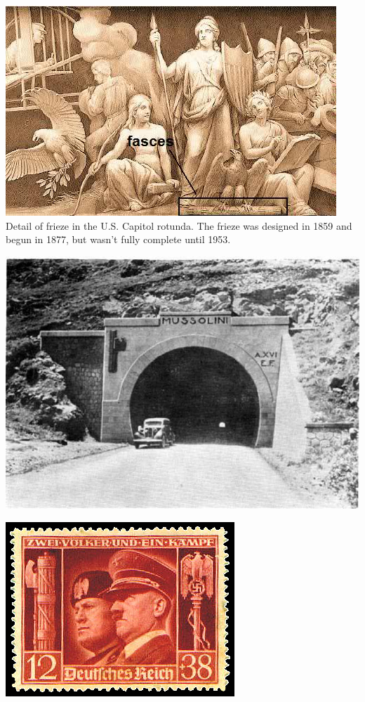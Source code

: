 \begin{frame}
    \centering
    \includegraphics[height=.8\textheight]{img/fasces/teut1.jpg} \\
    Detail of frieze in the U.S. Capitol rotunda. The frieze was designed in 1859 and begun in 1877, but wasn't fully complete until 1953. \\
\end{frame}
\begin{frame}
    \centering
    \includegraphics[width=.9\textwidth]{img/fasces/tunnel.jpg} \\
\end{frame}

\begin{frame}
    \centering
    \includegraphics[width=.9\textwidth]{img/reich-stamp.png} \\
\end{frame}

